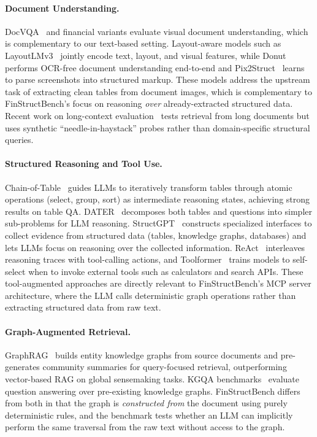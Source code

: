 \documentclass[11pt]{article}
\begin{document}
\paragraph{Document Understanding.}
DocVQA~\citep{mathew2021docvqa} and financial variants evaluate visual
document understanding, which is complementary to our text-based setting.
Layout-aware models such as LayoutLMv3~\citep{huang2022layoutlmv3}
jointly encode text, layout, and visual features, while
Donut~\citep{kim2022donut} performs OCR-free document understanding
end-to-end and Pix2Struct~\citep{lee2023pix2struct} learns to parse
screenshots into structured markup.  These models address the upstream
task of extracting clean tables from document images, which is
complementary to FinStructBench's focus on reasoning \emph{over}
already-extracted structured data.
Recent work on long-context evaluation~\citep{li2024long} tests retrieval
from long documents but uses synthetic ``needle-in-haystack'' probes rather
than domain-specific structural queries.

\paragraph{Structured Reasoning and Tool Use.}
Chain-of-Table~\citep{wang2024chainoftable} guides LLMs to iteratively
transform tables through atomic operations (select, group, sort) as
intermediate reasoning states, achieving strong results on table QA.
DATER~\citep{ye2023dater} decomposes both tables and questions into
simpler sub-problems for LLM reasoning.
StructGPT~\citep{jiang2023structgpt} constructs specialized interfaces
to collect evidence from structured data (tables, knowledge graphs,
databases) and lets LLMs focus on reasoning over the collected information.
ReAct~\citep{yao2023react} interleaves reasoning traces with tool-calling
actions, and Toolformer~\citep{schick2023toolformer} trains models to
self-select when to invoke external tools such as calculators and search
APIs.  These tool-augmented approaches are directly relevant to
FinStructBench's MCP server architecture, where the LLM calls
deterministic graph operations rather than extracting structured data
from raw text.

\paragraph{Graph-Augmented Retrieval.}
GraphRAG~\citep{edge2024graphrag} builds entity knowledge graphs from
source documents and pre-generates community summaries for query-focused
retrieval, outperforming vector-based RAG on global sensemaking tasks.
KGQA benchmarks~\citep{zhang2022subgraph} evaluate question answering over
pre-existing knowledge graphs.  FinStructBench differs from both
in that the graph is \emph{constructed from} the document using purely
deterministic rules, and the benchmark tests whether an LLM can
implicitly perform the same traversal from the raw text without access
to the graph.
\end{document}
